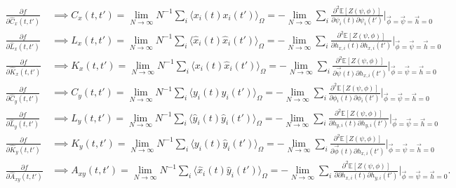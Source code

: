 \documentclass[.../main.tex]{subfiles}
\begin{document}
\begin{align*}
	\frac{\partial f}{\partial \hat{C}_x(t, t')} &\implies C_x(t, t') = \lim_{N \rightarrow \infty}
N^{-1} \sum_i \langle x_i(t) x_i(t')\rangle _\Omega = -\lim_{N \rightarrow \infty} \sum_i
\frac{\partial^2\mathbb{E}[Z(\psi, \phi)]}{\partial \psi_i(t) \partial \psi_i (t')} \bigg|_{\Vec
{\phi} = \Vec{\psi} = \Vec{h} = 0}\\
	\frac{\partial f}{\partial \hat{L}_x(t, t')} &\implies L_x(t, t') = \lim_{N \rightarrow \infty}
N^{-1} \sum_i \langle \hat{x}_i(t) \hat{x}_i(t')\rangle _\Omega = -\lim_{N \rightarrow \infty} \sum_i
\frac{\partial^2\mathbb{E}[Z(\psi, \phi)]}{\partial h_{x,i}(t) \partial h_{x, i} (t')} \bigg|_{\Vec
{\phi} = \Vec{\psi} = \Vec{h} = 0}\\
	\frac{\partial f}{\partial \hat{K}_x(t, t')} &\implies K_x(t, t') = \lim_{N \rightarrow \infty}
N^{-1} \sum_i \langle x_i(t) \hat{x}_i(t')\rangle _\Omega = -\lim_{N \rightarrow \infty} \sum_i
\frac{\partial^2\mathbb{E}[Z(\psi, \phi)]}{\partial \Vec{\psi}(t) \partial h_{x, i} (t')}
\bigg|_{\Vec{\phi} = \Vec{\psi} = \Vec{h} = 0}\\
\frac{\partial f}{\partial \hat{C}_y(t, t')} &\implies C_y(t, t') = \lim_{N \rightarrow \infty}
N^{-1} \sum_i \langle y_i(t) y_i(t')\rangle _\Omega = -\lim_{N \rightarrow \infty} \sum_i
\frac{\partial^2\mathbb{E}[Z(\psi, \phi)]}{\partial \phi_i(t) \partial \phi_i (t')} \bigg|_{\Vec
{\phi} = \Vec{\psi} = \Vec{h} = 0}\\
	\frac{\partial f}{\partial \hat{L}_y(t, t')} &\implies L_y(t, t') = \lim_{N \rightarrow \infty}
N^{-1} \sum_i \langle \hat{y}_i(t) \hat{y}_i(t')\rangle _\Omega = -\lim_{N \rightarrow \infty} \sum_i
\frac{\partial^2\mathbb{E}[Z(\psi, \phi)]}{\partial h_{y,i}(t) \partial h_{y, i} (t')} \bigg|_{\Vec
{\phi} = \Vec{\psi} = \Vec{h} = 0}\\
	\frac{\partial f}{\partial \hat{K}_y(t, t')} &\implies K_y(t, t') = \lim_{N \rightarrow \infty}
N^{-1} \sum_i \langle y_i(t) \hat{y}_i(t')\rangle _\Omega = -\lim_{N \rightarrow \infty} \sum_i
\frac{\partial^2\mathbb{E}[Z(\psi, \phi)]}{\partial \Vec{\phi}(t) \partial h_{x, i} (t')}
\bigg|_{\Vec{\phi} = \Vec{\psi} = \Vec{h} = 0}\\
	\frac{\partial f}{\partial \hat{A}_{xy}(t, t')} &\implies A_{xy}(t, t') = \lim_{N \rightarrow
	\infty}
N^{-1} \sum_i \langle \hat{x}_i(t) \hat{y}_i(t')\rangle _\Omega = -\lim_{N \rightarrow \infty} \sum_i
\frac{\partial^2\mathbb{E}[Z(\psi, \phi)]}{\partial \partial h_{x, i} (t) \partial h_{y, i} (t')}
\bigg|_{\Vec{\phi} = \Vec{\psi} = \Vec{h} = 0}.\\
\end{align*}
\end{document}
